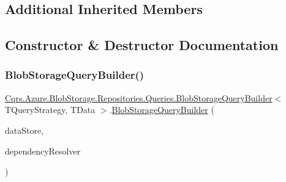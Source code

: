 \subsection*{Additional Inherited Members}


\subsection{Constructor \& Destructor Documentation}
\mbox{\label{classCqrs_1_1Azure_1_1BlobStorage_1_1Repositories_1_1Queries_1_1BlobStorageQueryBuilder_ae6519f289d2b7be9d322dfa7171dea8b_ae6519f289d2b7be9d322dfa7171dea8b}} 
\subsubsection{\texorpdfstring{Blob\+Storage\+Query\+Builder()}{BlobStorageQueryBuilder()}}
{\footnotesize\ttfamily \hyperlink{classCqrs_1_1Azure_1_1BlobStorage_1_1Repositories_1_1Queries_1_1BlobStorageQueryBuilder}{Cqrs.\+Azure.\+Blob\+Storage.\+Repositories.\+Queries.\+Blob\+Storage\+Query\+Builder}$<$ T\+Query\+Strategy, T\+Data $>$.\hyperlink{classCqrs_1_1Azure_1_1BlobStorage_1_1Repositories_1_1Queries_1_1BlobStorageQueryBuilder}{Blob\+Storage\+Query\+Builder} (\begin{DoxyParamCaption}\item[{\hyperlink{interfaceCqrs_1_1DataStores_1_1IDataStore}{I\+Data\+Store}$<$ T\+Data $>$}]{data\+Store,  }\item[{\hyperlink{interfaceCqrs_1_1Configuration_1_1IDependencyResolver}{I\+Dependency\+Resolver}}]{dependency\+Resolver }\end{DoxyParamCaption})\hspace{0.3cm}{\ttfamily [protected]}}



